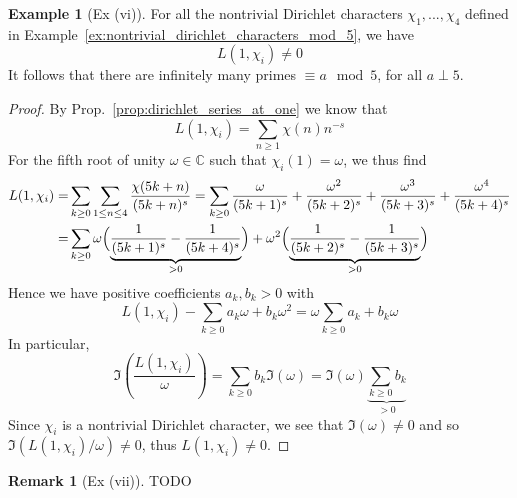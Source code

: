 \documentclass{scrartcl}
\newcommand{\C}{\mathbb{C}}
\theoremstyle{definition}
\newtheorem{remark}[definition]{Remark}
\newtheorem{example}[definition]{Example}
\begin{document}
\begin{example}[Ex (vi)]
    For all the nontrivial Dirichlet characters $\chi_1, ..., \chi_4$ defined in Example~\ref{ex:nontrivial_dirichlet_characters_mod_5}, we have
    \begin{equation*}
        L(1, \chi_i) \neq 0
    \end{equation*}
    It follows that there are infinitely many primes $\equiv a \mod 5$, for all $a \perp 5$.
\end{example}
\begin{proof}
    By Prop.~\ref{prop:dirichlet_series_at_one} we know that
    \begin{equation*}
        L(1, \chi_i) = \sum_{n \geq 1} \chi(n) n^{-s}
    \end{equation*}
    For the fifth root of unity $\omega \in \C$ such that $\chi_i(1) = \omega$, we thus find
    \begin{align*}
        L(1, \chi_i) =& \sum_{k \geq 0} \sum_{1 \leq n \leq 4} \frac {\chi(5k + n)} {(5k + n)^s} = \sum_{k \geq 0} \frac {\omega} {(5k + 1)^s} + \frac {\omega^2} {(5k + 2)^s} + \frac {\omega^3} {(5k + 3)^s} + \frac {\omega^4} {(5k + 4)^s} \\
        =& \sum_{k \geq 0} \omega \Bigl( \underbrace{\frac 1 {(5k + 1)^s} - \frac 1 {(5k + 4)^s}}_{> 0} \Bigr) + \omega^2 \Bigl( \underbrace{\frac 1 {(5k + 2)^s} - \frac 1 {(5k + 3)^s}}_{> 0} \Bigr)
    \end{align*}
    Hence we have positive coefficients $a_k, b_k > 0$ with
    \begin{equation*}
        L(1, \chi_i) - \sum_{k \geq 0} a_k \omega + b_k \omega^2 = \omega \sum_{k \geq 0} a_k + b_k \omega
    \end{equation*}
    In particular,
    \begin{equation*}
        \Im\left( \frac {L(1, \chi_i)} {\omega} \right) = \sum_{k \geq 0} b_k \Im(\omega) = \Im(\omega) \underbrace{ \sum_{k \geq 0} b_k }_{> 0}
    \end{equation*}
    Since $\chi_i$ is a nontrivial Dirichlet character, we see that $\Im(\omega) \neq 0$ and so $\Im(L(1, \chi_i)/\omega) \neq 0$, thus $L(1, \chi_i) \neq 0$.
\end{proof}
\begin{remark}[Ex (vii)]
    TODO
\end{remark}

\printbibliography
\end{document}
